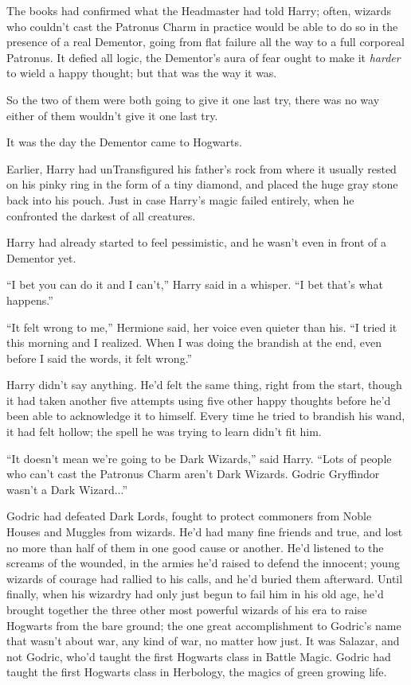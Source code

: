 The books had confirmed what the Headmaster had told Harry; often, wizards who couldn't cast the Patronus Charm in practice would be able to do so in the presence of a real Dementor, going from flat failure all the way to a full corporeal Patronus. It defied all logic, the Dementor's aura of fear ought to make it \emph{harder} to wield a happy thought; but that was the way it was.

So the two of them were both going to give it one last try, there was no way either of them wouldn't give it one last try.

It was the day the Dementor came to Hogwarts.

Earlier, Harry had unTransfigured his father's rock from where it usually rested on his pinky ring in the form of a tiny diamond, and placed the huge gray stone back into his pouch. Just in case Harry's magic failed entirely, when he confronted the darkest of all creatures.

Harry had already started to feel pessimistic, and he wasn't even in front of a Dementor yet.

``I bet you can do it and I can't,'' Harry said in a whisper. ``I bet that's what happens.''

``It felt wrong to me,'' Hermione said, her voice even quieter than his. ``I tried it this morning and I realized. When I was doing the brandish at the end, even before I said the words, it felt wrong.''

Harry didn't say anything. He'd felt the same thing, right from the start, though it had taken another five attempts using five other happy thoughts before he'd been able to acknowledge it to himself. Every time he tried to brandish his wand, it had felt hollow; the spell he was trying to learn didn't fit him.

``It doesn't mean we're going to be Dark Wizards,'' said Harry. ``Lots of people who can't cast the Patronus Charm aren't Dark Wizards. Godric Gryffindor wasn't a Dark Wizard...''

Godric had defeated Dark Lords, fought to protect commoners from Noble Houses and Muggles from wizards. He'd had many fine friends and true, and lost no more than half of them in one good cause or another. He'd listened to the screams of the wounded, in the armies he'd raised to defend the innocent; young wizards of courage had rallied to his calls, and he'd buried them afterward. Until finally, when his wizardry had only just begun to fail him in his old age, he'd brought together the three other most powerful wizards of his era to raise Hogwarts from the bare ground; the one great accomplishment to Godric's name that wasn't about war, any kind of war, no matter how just. It was Salazar, and not Godric, who'd taught the first Hogwarts class in Battle Magic. Godric had taught the first Hogwarts class in Herbology, the magics of green growing life.

